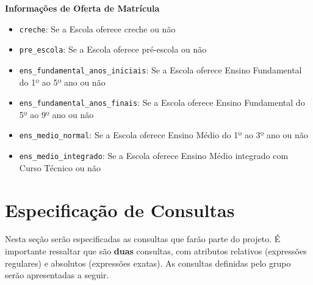 \documentclass[12pt,a4paper]{article}
\begin{document}
\begin{flushleft}
    \textbf{Informações de Oferta de Matrícula}
\end{flushleft}

\begin{itemize}

    \item \texttt{creche}: Se a Escola oferece creche ou não

    \item \texttt{pre\_escola}: Se a Escola oferece pré-escola ou não

    \item \texttt{ens\_fundamental\_anos\_iniciais}: Se a Escola oferece Ensino Fundamental do 1º ao 5º ano ou não

    \item \texttt{ens\_fundamental\_anos\_finais}: Se a Escola oferece Ensino Fundamental do 5º ao 9º ano ou não

    \item \texttt{ens\_medio\_normal}: Se a Escola oferece Ensino Médio do 1º ao 3º ano ou não

    \item \texttt{ens\_medio\_integrado}: Se a Escola oferece Ensino Médio integrado com Curso Técnico ou não

\end{itemize}

\section{Especificação de Consultas}

Nesta seção serão especificadas as consultas que farão parte do projeto. É importante ressaltar que são \textbf{duas} consultas, com atributos relativos (expressões regulares) e absolutos (expressões exatas). As consultas definidas pelo grupo serão apresentadas a seguir.
\end{document}
